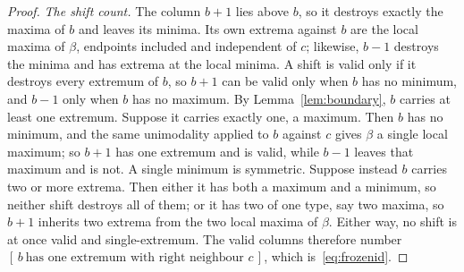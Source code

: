 \documentclass[10pt,a4paper]{amsart}
\begin{document}
\begin{proof}
\medskip\noindent\emph{The shift count.} The column $b+1$ lies above $b$, so it
destroys exactly the maxima of $b$ and leaves its minima. Its own extrema against
$b$ are the local maxima of $\beta$, endpoints included and independent of $c$;
likewise, $b-1$ destroys the minima and has extrema at the local minima. A shift is
valid only if it destroys every extremum of $b$, so $b+1$ can be valid only when
$b$ has no minimum, and $b-1$ only when $b$ has no maximum. By
Lemma~\ref{lem:boundary}, $b$ carries at least one extremum. Suppose it carries
exactly one, a maximum. Then $b$ has no minimum, and the same unimodality applied
to $b$ against $c$ gives $\beta$ a single local maximum; so $b+1$ has one extremum
and is valid, while $b-1$ leaves that maximum and is not. A single minimum is
symmetric. Suppose instead $b$ carries two or more extrema. Then either it has both
a maximum and a minimum, so neither shift destroys all of them; or it has two of
one type, say two maxima, so $b+1$ inherits two extrema from the two local maxima
of $\beta$. Either way, no shift is at once valid and single-extremum. The valid
columns therefore number $[\,b\ \text{has one extremum with right neighbour }c\,]$,
which is~\eqref{eq:frozenid}.
\end{proof}
\end{document}
